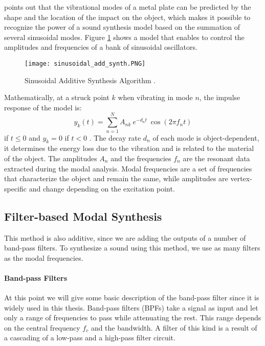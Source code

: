 \cite{Cook:2002:RSS:515316} points out that the vibrational modes of a  metal plate can be predicted by the shape and the location of the impact on the object, which makes it possible to recognize the power of a sound synthesis model based on the summation of several sinusoidal modes. Figure \ref{fig:sin_add_synth} shows a model that enables to control the amplitudes and frequencies of a bank of sinusoidal oscillators.

\begin{figure}[H]
  \centering
    \texttt{[image: sinusoidal\_add\_synth.PNG]}
      \caption{Sinusoidal Additive Synthesis Algorithm \cite{Cook:2002:RSS:515316}.}
      \label{fig:sin_add_synth}
\end{figure}

Mathematically, at a struck point $k$ when vibrating in mode $n$, the impulse response of the model is:
\begin{equation}\label{eq:modal_response}
y_k(t) = \sum\limits_{n=1}^{N} A_{nk}\ e^{-d_n t}\ \cos(2 \pi f_nt)
\end{equation}
if $t\leqslant 0$ and $y_k = 0$ if $t<0$ \cite{van2001foleyautomatic}. The decay rate $d_n$ of each mode is object-dependent, it determines the energy loss due to the vibration and is related to the material of the object. The amplitudes $A_n$ and the frequencies $f_n$ are the resonant data extracted during the modal analysis. Modal frequencies are a set of frequencies that characterize the object and remain the same, while amplitudes are vertex-specific and change depending on the excitation point.

\subsection{Filter-based Modal Synthesis}\label{sec:add_synth}

This method is also additive, since we are adding the outputs of a number of band-pass filters. To synthesize a sound using this method, we use as many filters as the modal frequencies.

\paragraph{Band-pass Filters\\}\label{par:bpf}

At this point we will give some basic description of the band-pass filter since it is widely used in this thesis. Band-pass filters (\gls{BPF}s) take a signal as input and let only a range of frequencies to pass while attenuating the rest. This range depends on the central frequency $f_c$ and the bandwidth. A filter of this kind is a result of a cascading of a low-pass and a high-pass filter circuit.

